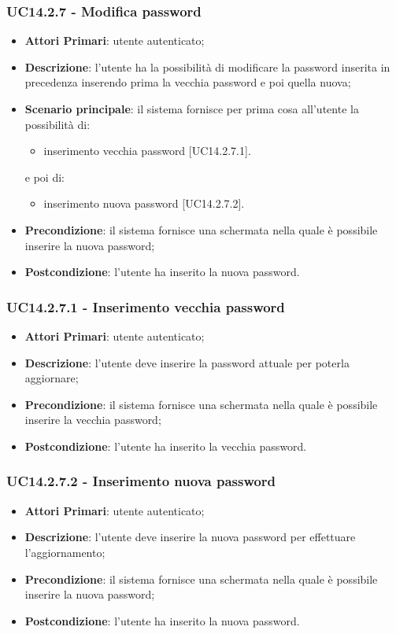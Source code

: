 \subsubsection{UC14.2.7 - Modifica password}
\begin{itemize}
	\item \textbf{Attori Primari}: utente autenticato;
	\item \textbf{Descrizione}: l'utente ha la possibilità di modificare la password inserita in precedenza inserendo prima la vecchia password e poi quella nuova;
	\item \textbf{Scenario principale}: il sistema fornisce per prima cosa all'utente la possibilità di:
		\begin{itemize}
			\item inserimento vecchia password [UC14.2.7.1].
		\end{itemize}
	e poi di:
		\begin{itemize}
			\item inserimento nuova password [UC14.2.7.2].
		\end{itemize}
	\item \textbf{Precondizione}: il sistema fornisce una schermata nella quale è possibile inserire la nuova password;
	\item \textbf{Postcondizione}: l'utente ha inserito la nuova password.
\end{itemize}

\subsubsection{UC14.2.7.1 - Inserimento vecchia password}
\begin{itemize}
	\item \textbf{Attori Primari}: utente autenticato;
	\item \textbf{Descrizione}: l'utente deve inserire la password attuale per poterla aggiornare;
	\item \textbf{Precondizione}: il sistema fornisce una schermata nella quale è possibile inserire la vecchia password;
	\item \textbf{Postcondizione}: l'utente ha inserito la vecchia password.
\end{itemize}

\subsubsection{UC14.2.7.2 - Inserimento nuova password}
\begin{itemize}
	\item \textbf{Attori Primari}: utente autenticato;
	\item \textbf{Descrizione}: l'utente deve inserire la nuova password per effettuare l'aggiornamento;
	\item \textbf{Precondizione}: il sistema fornisce una schermata nella quale è possibile inserire la nuova password;
	\item \textbf{Postcondizione}: l'utente ha inserito la nuova password.
\end{itemize}

